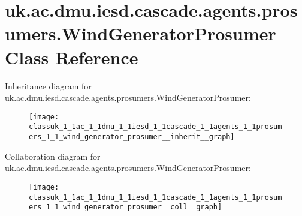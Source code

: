 \hypertarget{classuk_1_1ac_1_1dmu_1_1iesd_1_1cascade_1_1agents_1_1prosumers_1_1_wind_generator_prosumer}{\section{uk.\-ac.\-dmu.\-iesd.\-cascade.\-agents.\-prosumers.\-Wind\-Generator\-Prosumer Class Reference}
\label{classuk_1_1ac_1_1dmu_1_1iesd_1_1cascade_1_1agents_1_1prosumers_1_1_wind_generator_prosumer}
}


Inheritance diagram for uk.\-ac.\-dmu.\-iesd.\-cascade.\-agents.\-prosumers.\-Wind\-Generator\-Prosumer\-:\nopagebreak
\begin{figure}[H]
\begin{center}
\leavevmode
\texttt{[image: classuk\_1\_1ac\_1\_1dmu\_1\_1iesd\_1\_1cascade\_1\_1agents\_1\_1prosumers\_1\_1\_wind\_generator\_prosumer\_\_inherit\_\_graph]}
\end{center}
\end{figure}


Collaboration diagram for uk.\-ac.\-dmu.\-iesd.\-cascade.\-agents.\-prosumers.\-Wind\-Generator\-Prosumer\-:\nopagebreak
\begin{figure}[H]
\begin{center}
\leavevmode
\texttt{[image: classuk\_1\_1ac\_1\_1dmu\_1\_1iesd\_1\_1cascade\_1\_1agents\_1\_1prosumers\_1\_1\_wind\_generator\_prosumer\_\_coll\_\_graph]}
\end{center}
\end{figure}
